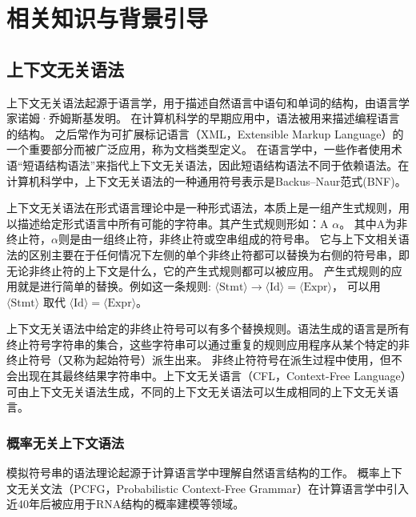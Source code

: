 
\chapter{相关知识与背景引导}

\section{上下文无关语法}

上下文无关语法起源于语言学，用于描述自然语言中语句和单词的结构，由语言学家诺姆·乔姆斯基发明。
在计算机科学的早期应用中，语法被用来描述编程语言的结构。
之后常作为可扩展标记语言（XML，Extensible Markup Language）的一个重要部分而被广泛应用，称为文档类型定义\cite{hopcroft2001introduction}。
在语言学中，一些作者使用术语“短语结构语法”来指代上下文无关语法，因此短语结构语法不同于依赖语法。在计算机科学中，上下文无关语法的一种通用符号表示是Backus–Naur范式(BNF)。

上下文无关语法在形式语言理论中是一种形式语法，本质上是一组产生式规则，用以描述给定形式语言中所有可能的字符串。其产生式规则形如：A \rightarrow $\alpha$。
其中A为非终止符，$\alpha$则是由一组终止符，非终止符或空串组成的符号串。
它与上下文相关语法的区别主要在于任何情况下左侧的单个非终止符都可以替换为右侧的符号串，即无论非终止符的上下文是什么，它的产生式规则都可以被应用。
产生式规则的应用就是进行简单的替换。例如这一条规则: $\displaystyle \langle {\text{Stmt}}\rangle \to \langle {\text{Id}}\rangle =\langle {\text{Expr}}\rangle$，
可以用$\displaystyle \langle {\text{Stmt}}\rangle$ 取代 $\langle {\text{Id}}\rangle =\langle {\text{Expr}}\rangle$。

上下文无关语法中给定的非终止符号可以有多个替换规则。语法生成的语言是所有终止符号字符串的集合，这些字符串可以通过重复的规则应用程序从某个特定的非终止符号（又称为起始符号）派生出来。
非终止符符号在派生过程中使用，但不会出现在其最终结果字符串中。上下文无关语言（CFL，Context-Free Language）可由上下文无关语法生成，不同的上下文无关语法可以生成相同的上下文无关语言。

\subsection{概率无关上下文语法}

模拟符号串的语法理论起源于计算语言学中理解自然语言结构的工作\cite{chomsky1956three,chomsky1959certain,lees1957syntactic}。
概率上下文无关文法（PCFG，Probabilistic Context-Free Grammar）在计算语言学中引入近40年后被应用于RNA结构的概率建模等领域\cite{sakakibara1994stochastic}。

